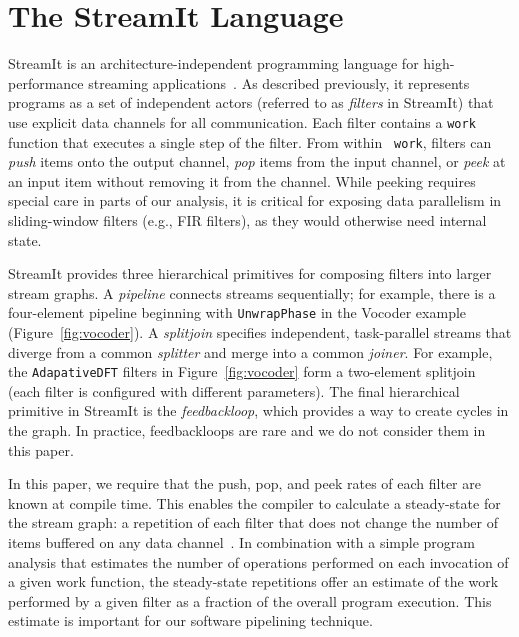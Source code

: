 \section{The StreamIt Language}

StreamIt is an architecture-independent programming language for
high-performance streaming
applications~\cite{streamitcc,streamit-lang-spec}.  As described
previously, it represents programs as a set of independent actors
(referred to as {\it filters} in StreamIt) that use explicit data
channels for all communication.  Each filter contains a {\tt work}
function that executes a single step of the filter.  From within {\tt
work}, filters can {\it push} items onto the output channel, {\it pop}
items from the input channel, or {\it peek} at an input item without
removing it from the channel.  
While peeking requires special care in parts of our analysis, it is
critical for exposing data parallelism in sliding-window filters
(e.g., FIR filters), as they would otherwise need internal state.

StreamIt provides three hierarchical primitives for composing filters
into larger stream graphs.  A {\it pipeline} connects streams
sequentially; for example, there is a four-element pipeline beginning
with {\tt UnwrapPhase} in the Vocoder example
(Figure~\ref{fig:vocoder}).  A {\it splitjoin} specifies independent,
task-parallel streams that diverge from a common {\it splitter} and
merge into a common {\it joiner}.  For example, the {\tt AdapativeDFT}
filters in Figure~\ref{fig:vocoder} form a two-element splitjoin (each
filter is configured with different parameters).  The final
hierarchical primitive in StreamIt is the {\it feedbackloop}, which
provides a way to create cycles in the graph.  In practice,
feedbackloops are rare and we do not consider them in this paper.

In this paper, we require that the push, pop, and peek rates of each
filter are known at compile time.  This enables the compiler to
calculate a steady-state for the stream graph: a repetition of each
filter that does not change the number of items buffered on any data
channel~\cite{lee87,karczmarek:lctes:2003}. In combination with a
simple program analysis that estimates the number of operations
performed on each invocation of a given work function, the
steady-state repetitions offer an estimate of the work performed by a
given filter as a fraction of the overall program execution.  This
estimate is important for our software pipelining technique.
